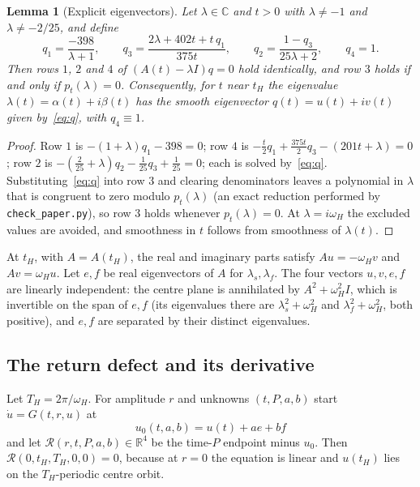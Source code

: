 \documentclass[11pt,a4paper]{article}
\theoremstyle{plain}
\newtheorem{lemma}[theorem]{Lemma}
\theoremstyle{definition}
\theoremstyle{remark}
\newcommand{\R}{\mathbb{R}}
\newcommand{\C}{\mathbb{C}}
\begin{document}
\begin{lemma}[Explicit eigenvectors]\label{lem:eigvec}
Let $\lambda\in\C$ and $t>0$ with $\lambda\ne-1$ and $\lambda\ne-2/25$, and define
\begin{equation}\label{eq:q}
q_1=\frac{-398}{\lambda+1},\qquad
q_3=\frac{2\lambda+402t+t\,q_1}{375t},\qquad
q_2=\frac{1-q_3}{25\lambda+2},\qquad q_4=1 .
\end{equation}
Then rows $1$, $2$ and $4$ of $(A(t)-\lambda I)q=0$ hold identically, and row $3$ holds if and only if $p_t(\lambda)=0$. Consequently, for $t$ near $t_H$ the eigenvalue $\lambda(t)=\alpha(t)+i\beta(t)$ has the smooth eigenvector $q(t)=u(t)+iv(t)$ given by~\eqref{eq:q}, with $q_4\equiv1$.
\end{lemma}

\begin{proof}
Row $1$ is $-(1+\lambda)q_1-398=0$; row $4$ is $-\tfrac t2q_1+\tfrac{375t}{2}q_3-(201t+\lambda)=0$; row $2$ is $-(\tfrac{2}{25}+\lambda)q_2-\tfrac1{25}q_3+\tfrac1{25}=0$; each is solved by~\eqref{eq:q}. Substituting~\eqref{eq:q} into row $3$ and clearing denominators leaves a polynomial in $\lambda$ that is congruent to zero modulo $p_t(\lambda)$ (an exact reduction performed by \texttt{check\_paper.py}), so row $3$ holds whenever $p_t(\lambda)=0$. At $\lambda=i\omega_H$ the excluded values are avoided, and smoothness in $t$ follows from smoothness of $\lambda(t)$.
\end{proof}

At $t_H$, with $A=A(t_H)$, the real and imaginary parts satisfy $Au=-\omega_Hv$ and $Av=\omega_Hu$. Let $e,f$ be real eigenvectors of $A$ for $\lambda_s,\lambda_f$. The four vectors $u,v,e,f$ are linearly independent: the centre plane is annihilated by $A^2+\omega_H^2I$, which is invertible on the span of $e,f$ (its eigenvalues there are $\lambda_s^2+\omega_H^2$ and $\lambda_f^2+\omega_H^2$, both positive), and $e,f$ are separated by their distinct eigenvalues.

\subsection{The return defect and its derivative}

Let $T_H=2\pi/\omega_H$. For amplitude $r$ and unknowns $(t,P,a,b)$ start $\dot u=G(t,r,u)$ at
\begin{equation}\label{eq:u0}
u_0(t,a,b)=u(t)+ae+bf
\end{equation}
and let $\mathcal R(r,t,P,a,b)\in\R^4$ be the time-$P$ endpoint minus $u_0$. Then $\mathcal R(0,t_H,T_H,0,0)=0$, because at $r=0$ the equation is linear and $u(t_H)$ lies on the $T_H$-periodic centre orbit.
\end{document}

